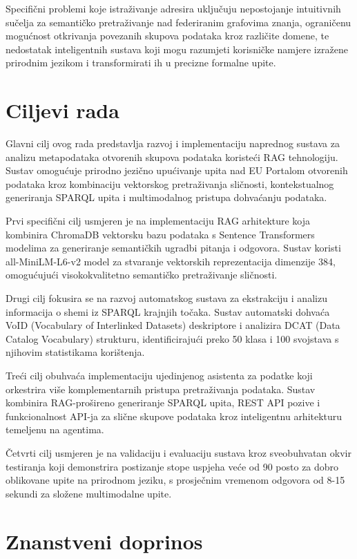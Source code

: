 Specifični problemi koje istraživanje adresira uključuju nepostojanje intuitivnih sučelja za semantičko pretraživanje nad federiranim grafovima znanja, ograničenu mogućnost otkrivanja povezanih skupova podataka kroz različite domene, te nedostatak inteligentnih sustava koji mogu razumjeti korisničke namjere izražene prirodnim jezikom i transformirati ih u precizne formalne upite.

\section{Ciljevi rada}
\label{sec:objectives}

Glavni cilj ovog rada predstavlja razvoj i implementaciju naprednog sustava za analizu metapodataka otvorenih skupova podataka koristeći RAG tehnologiju. Sustav omogućuje prirodno jezično upućivanje upita nad EU Portalom otvorenih podataka kroz kombinaciju vektorskog pretraživanja sličnosti, kontekstualnog generiranja SPARQL upita i multimodalnog pristupa dohvaćanju podataka.

Prvi specifični cilj usmjeren je na implementaciju RAG arhitekture koja kombinira ChromaDB vektorsku bazu podataka s Sentence Transformers modelima za generiranje semantičkih ugradbi pitanja i odgovora. Sustav koristi all-MiniLM-L6-v2 model za stvaranje vektorskih reprezentacija dimenzije 384, omogućujući visokokvalitetno semantičko pretraživanje sličnosti.

Drugi cilj fokusira se na razvoj automatskog sustava za ekstrakciju i analizu informacija o shemi iz SPARQL krajnjih točaka. Sustav automatski dohvaća VoID (Vocabulary of Interlinked Datasets) deskriptore i analizira DCAT (Data Catalog Vocabulary) strukturu, identificirajući preko 50 klasa i 100 svojstava s njihovim statistikama korištenja.

Treći cilj obuhvaća implementaciju ujedinjenog asistenta za podatke koji orkestrira više komplementarnih pristupa pretraživanja podataka. Sustav kombinira RAG-prošireno generiranje SPARQL upita, REST API pozive i funkcionalnost API-ja za slične skupove podataka kroz inteligentnu arhitekturu temeljenu na agentima.

Četvrti cilj usmjeren je na validaciju i evaluaciju sustava kroz sveobuhvatan okvir testiranja koji demonstrira postizanje stope uspjeha veće od 90 posto za dobro oblikovane upite na prirodnom jeziku, s prosječnim vremenom odgovora od 8-15 sekundi za složene multimodalne upite.

\section{Znanstveni doprinos}
\label{sec:contributions}

